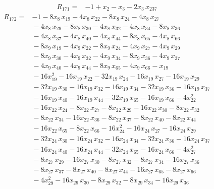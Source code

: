 \documentclass[11pt]{article}
\begin{document}
\begin{equation*}\begin{aligned}
R_{171}={}&-1 + x_{2} - x_{3} - 2x_{3}\,x_{237}
\end{aligned}\end{equation*}
\begin{equation*}\begin{aligned}
R_{172}={}&-1 - 8x_{8}\,x_{19} - 4x_{8}\,x_{22} - 8x_{8}\,x_{24} - 4x_{8}\,x_{27} \\
&{} - 4x_{8}\,x_{29} - 8x_{8}\,x_{30} - 4x_{8}\,x_{32} - 4x_{8}\,x_{34} - 8x_{8}\,x_{36} \\
&{} - 4x_{8}\,x_{37} - 4x_{8}\,x_{40} - 4x_{8}\,x_{44} - 8x_{8}\,x_{65} - 4x_{8}\,x_{66} \\
&{} - 8x_{9}\,x_{19} - 4x_{9}\,x_{22} - 8x_{9}\,x_{24} - 4x_{9}\,x_{27} - 4x_{9}\,x_{29} \\
&{} - 8x_{9}\,x_{30} - 4x_{9}\,x_{32} - 4x_{9}\,x_{34} - 8x_{9}\,x_{36} - 4x_{9}\,x_{37} \\
&{} - 4x_{9}\,x_{40} - 4x_{9}\,x_{44} - 8x_{9}\,x_{65} - 4x_{9}\,x_{66} - x_{19} \\
&{} - 16x_{19}^{2} - 16x_{19}\,x_{22} - 32x_{19}\,x_{24} - 16x_{19}\,x_{27} - 16x_{19}\,x_{29} \\
&{} - 32x_{19}\,x_{30} - 16x_{19}\,x_{32} - 16x_{19}\,x_{34} - 32x_{19}\,x_{36} - 16x_{19}\,x_{37} \\
&{} - 16x_{19}\,x_{40} - 16x_{19}\,x_{44} - 32x_{19}\,x_{65} - 16x_{19}\,x_{66} - 4x_{22}^{2} \\
&{} - 16x_{22}\,x_{24} - 8x_{22}\,x_{27} - 8x_{22}\,x_{29} - 16x_{22}\,x_{30} - 8x_{22}\,x_{32} \\
&{} - 8x_{22}\,x_{34} - 16x_{22}\,x_{36} - 8x_{22}\,x_{37} - 8x_{22}\,x_{40} - 8x_{22}\,x_{44} \\
&{} - 16x_{22}\,x_{65} - 8x_{22}\,x_{66} - 16x_{24}^{2} - 16x_{24}\,x_{27} - 16x_{24}\,x_{29} \\
&{} - 32x_{24}\,x_{30} - 16x_{24}\,x_{32} - 16x_{24}\,x_{34} - 32x_{24}\,x_{36} - 16x_{24}\,x_{37} \\
&{} - 16x_{24}\,x_{40} - 16x_{24}\,x_{44} - 32x_{24}\,x_{65} - 16x_{24}\,x_{66} - 4x_{27}^{2} \\
&{} - 8x_{27}\,x_{29} - 16x_{27}\,x_{30} - 8x_{27}\,x_{32} - 8x_{27}\,x_{34} - 16x_{27}\,x_{36} \\
&{} - 8x_{27}\,x_{37} - 8x_{27}\,x_{40} - 8x_{27}\,x_{44} - 16x_{27}\,x_{65} - 8x_{27}\,x_{66} \\
&{} - 4x_{29}^{2} - 16x_{29}\,x_{30} - 8x_{29}\,x_{32} - 8x_{29}\,x_{34} - 16x_{29}\,x_{36} \\

\end{aligned}
\end{equation*}
\end{document}
